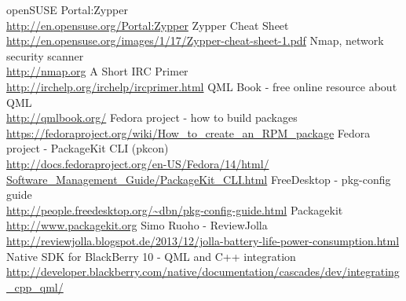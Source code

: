 \begin{thebibliography}{xxxxxxxxxxxx}
%
%
 openSUSE Portal:Zypper \\\url{http://en.opensuse.org/Portal:Zypper}
 Zypper Cheat Sheet \\\url{http://en.opensuse.org/images/1/17/Zypper-cheat-sheet-1.pdf}
%
%
 Nmap, network security scanner \\\url{http://nmap.org}
%
%
 A Short IRC Primer \\\url{http://irchelp.org/irchelp/ircprimer.html}
%
%
 QML Book - free online resource about QML\\\url{http://qmlbook.org/}
%
%
 Fedora project - how to build packages \\\url{https://fedoraproject.org/wiki/How_to_create_an_RPM_package}
 Fedora project - PackageKit CLI (pkcon) \\\url{http://docs.fedoraproject.org/en-US/Fedora/14/html/
Software_Management_Guide/PackageKit_CLI.html}
%
%
 FreeDesktop - pkg-config guide \\\url{http://people.freedesktop.org/~dbn/pkg-config-guide.html}
 Packagekit \\\url{http://www.packagekit.org}
%
%
 Simo Ruoho - ReviewJolla \\\url{http://reviewjolla.blogspot.de/2013/12/jolla-battery-life-power-consumption.html}
%
%
 Native SDK	for BlackBerry 10 - QML and C++ integration \\\url{http://developer.blackberry.com/native/documentation/cascades/dev/integrating_cpp_qml/}
%
%
\end{thebibliography}
